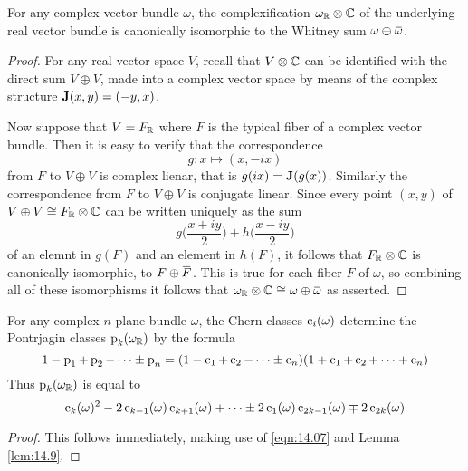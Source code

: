 \documentclass[../main]{subfiles}
\begin{document}
\begin{lemma}
\label{lem:15.04}
For any complex vector bundle $\omega$, the complexification $\omega_{\mathbb R} \otimes \mathbb C$ of the underlying real vector bundle is canonically isomorphic to the Whitney sum $\omega \oplus \xoverline{\omega}$.
\end{lemma}
\begin{proof}
For any real vector space $V$, recall that $V \otimes \mathbb C$ can be identified with the direct sum $V \oplus V$, made into a complex vector space by means of the complex structure $\mathbf{J}(x,y) = (-y,x)$. 

Now suppose that $V = F_\mathbb R$ where $F$ is the typical fiber of a complex vector bundle. Then it is easy to verify that the correspondence \[g:x \mapsto (x,-ix)\] from $F$ to $V \oplus V$ is complex lienar, that is $g(ix) = \mathbf{J}(g(x))$. Similarly the correspondence from $F$ to $V \oplus V$ is  conjugate linear. Since every point $(x,y)$ of $V \oplus V \cong F_\mathbb R \otimes \mathbb C$ can be written uniquely as the sum \[g\bigg(\frac{x+iy}{2}\bigg) + h\bigg(\frac{x-iy}{2}\bigg)\] of an elemnt in $g(F)$ and an element in $h(F)$, it follows that $F_\mathbb R \otimes \mathbb C$ is canonically isomorphic,  to $F \oplus \xoverline{F}$. This is true for each fiber $F$ of $\omega$, so combining all of these isomorphisms it follows that $\omega_\bR \otimes \bC \cong \omega \oplus \xoverline{\omega}$ as asserted.
\end{proof}

\begin{corollary}
\label{cor:15.05}
For any complex $n$-plane bundle $\omega$, the Chern classes $\operatorname{c}_i(\omega)$ determine the Pontrjagin classes $\operatorname{p}_k(\omega_\mathbb R)$ by the formula \[1-\operatorname{p}_1+\operatorname{p}_2 - \cdots \pm \operatorname{p}_n = (1-\operatorname{c}_1+\operatorname{c}_2 -\cdots \pm \operatorname{c}_n)(1+\operatorname{c}_1 +\operatorname{c}_2 + \cdots + \operatorname{c}_n)\] Thus $\operatorname{p}_k(\omega_\mathbb R)$ is equal to \[ \operatorname{c}_k(\omega)^2 - 2\operatorname{c}_{k-1}(\omega)\operatorname{c}_{k+1}(\omega) + \cdots \pm 2\operatorname{c}_1(\omega)\operatorname{c}_{2k-1}(\omega) \mp 2\operatorname{c}_{2k}(\omega)\]
\end{corollary}
\begin{proof}
This follows immediately, making use of \ref{eqn:14.07} and Lemma \ref{lem:14.9}.
\end{proof}
\end{document}
